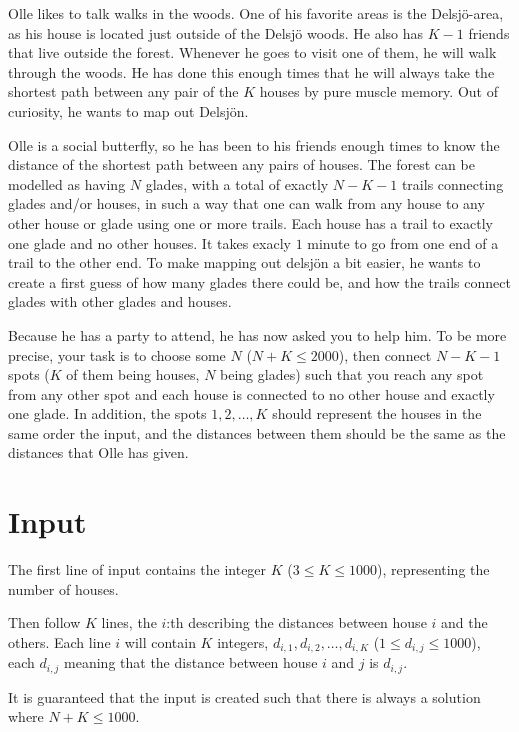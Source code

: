 \noindent

Olle likes to talk walks in the woods. One of his favorite areas is the Delsjö-area, as his house is located
just outside of the Delsjö woods. He also has $K-1$ friends that live outside the forest. Whenever he goes to
visit one of them, he will walk through the woods. He has done this enough times that he will always take
the shortest path between any pair of the $K$ houses by pure muscle memory. Out of curiosity, he wants to map
out Delsjön.

Olle is a social butterfly, so he has been to his friends enough times to know the distance of the shortest
path between any pairs of houses. The forest can be modelled as having $N$ glades, with a total of exactly
$N-K-1$ trails connecting glades and/or houses, in such a way that one can walk from any house to any other
house or glade using one or more trails. Each house has a trail to exactly one glade and no other houses.
It takes exacly $1$ minute to go from one end of a trail to the other end.
To make mapping out delsjön a bit easier, he wants to create a
first guess of how many glades there could be, and how the trails connect glades with other glades and houses.

Because he has a party to attend, he has now asked you to help him. To be more precise, your task is to choose some
$N$ ($N+K \leq 2000$), then connect $N-K-1$ spots ($K$ of them being houses, $N$ being glades) such that you reach any spot from any other spot
and each house is connected to no other house and exactly one glade. In addition, the spots $1,2, \dots, K$ should represent
the houses in the same order the input, and the distances between them should be the same as the distances that Olle
has given. 

\section*{Input}
The first line of input contains the integer $K$ ($3 \leq K \leq 1000$), representing the number of houses.

Then follow $K$ lines, the $i$:th describing the distances between house $i$ and the others. Each line $i$ will contain
$K$ integers, $d_{i,1}, d_{i,2}, \dots, d_{i,K}$ ($1 \leq d_{i,j} \leq 1000$), each $d_{i,j}$ meaning that the distance 
between house $i$ and $j$ is $d_{i,j}$.

It is guaranteed that the input is created such that there is always a solution where $N+K \leq 1000$.

